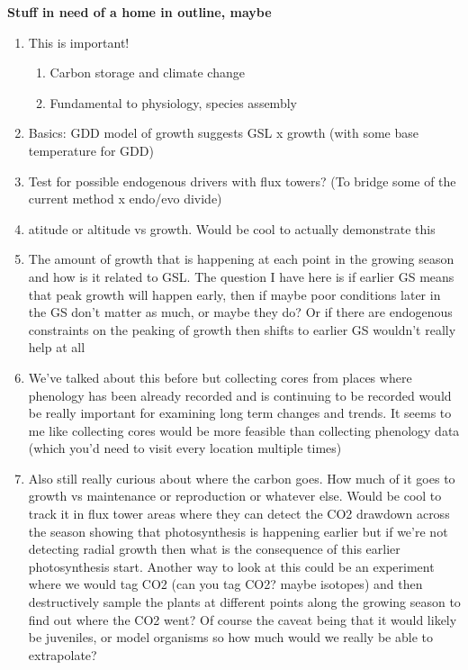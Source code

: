 \documentclass[11pt,letter]{article}
\begin{document}
\newpage
{\bf Stuff in need of a home in outline, maybe} 
\begin{enumerate}
\item This is important! 
\begin{enumerate}
\item Carbon storage and climate change
\item Fundamental to physiology, species assembly
\end{enumerate}
\item Basics: GDD model of growth suggests GSL x growth (with some base temperature for GDD)
\item Test for possible endogenous drivers with flux towers? (To bridge some of the current method x endo/evo divide)
\item atitude or altitude vs growth. Would be cool to actually demonstrate this
\item The amount of growth that is happening at each point in the growing season and how is it related to GSL. The question I have here is if earlier GS means that peak growth will happen early, then if maybe poor conditions later in the GS don’t matter as much, or maybe they do? Or if there are endogenous constraints on the peaking of growth then shifts to earlier GS wouldn’t really help at all
\item We’ve talked about this before but collecting cores from places where phenology has been already recorded and is continuing to be recorded would be really important for examining long term changes and trends. It seems to me like collecting cores would be more feasible than collecting phenology data (which you’d need to visit every location multiple times)
\item Also still really curious about where the carbon goes. How much of it goes to growth vs maintenance or reproduction or whatever else. Would be cool to track it in flux tower areas where they can detect the CO2 drawdown across the season showing that photosynthesis is happening earlier but if we’re not detecting radial growth then what is the consequence of this earlier photosynthesis start. Another way to look at this could be an experiment where we would tag CO2 (can you tag CO2? maybe isotopes) and then destructively sample the plants at different points along the growing season to find out where the CO2 went? Of course the caveat being that it would likely be juveniles, or model organisms so how much would we really be able to extrapolate?
\end{enumerate}
\end{document}
